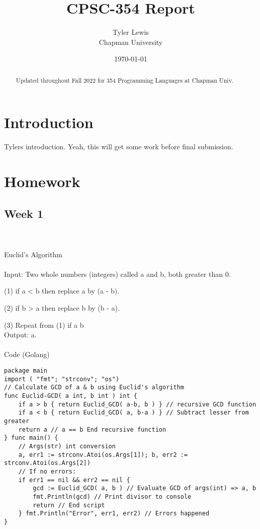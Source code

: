 \documentclass{article}
\title{CPSC-354 Report}
\author{Tyler Lewis  \\ Chapman University}
\date{\today}
\theoremstyle{theorem}
\theoremstyle{definition}
\theoremstyle{remark}
\begin{document}
\maketitle

\begin{abstract}
Updated throughout Fall 2022 for 354 Programming Languages at Chapman Univ.
\end{abstract}

\tableofcontents

\section{Introduction}\label{intro}

Tylers introduction. Yeah, this will get some work before final submission. 


\section{Homework}\label{homework}

\subsection{Week 1}

{\large \\\\Euclid's Algorithm\\\\}
Input: Two whole numbers (integers) called a and b, both greater than 0.

(1) if a {\textless} b then replace a by (a - b). 

(2) if b {\textgreater} a then replace b by (b - a).

(3) Repeat from (1) if a {\neq} b \\ 

Output: a.\\\\

{\large Code (Golang)}
\begin{lstlisting}
package main
import ( "fmt"; "strconv"; "os")
// Calculate GCD of a & b using Euclid's algorithm
func Euclid-GCD( a int, b int ) int {
    if a > b { return Euclid_GCD( a-b, b ) } // recursive GCD function
    if a < b { return Euclid_GCD( a, b-a ) } // Subtract lesser from greater
	return a // a == b End recursive function
} func main() {
    // Args(str) int conversion 
	a, err1 := strconv.Atoi(os.Args[1]); b, err2 := strconv.Atoi(os.Args[2])
    // If no errors:
	if err1 == nil && err2 == nil {
		gcd := Euclid_GCD( a, b ) // Evaluate GCD of args(int) => a, b
		fmt.Println(gcd) // Print divisor to console
		return // End script
    } fmt.Println("Error", err1, err2) // Errors happened
}
\end{lstlisting}
\end{document}
